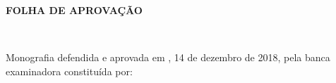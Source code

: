 \documentclass[
	12pt,				%
	openright,			%
	twoside,			%
	a4paper,			%
	english,			%
	french,				%
	spanish,			%
	brazil				%
	]{abntex2}
\begin{document}
\newpage


\afterpage{\null\newpage}



%
% 
%
\begin{folhadeaprovacao}
  \begin{center}
    {\ABNTEXchapterfont\large\imprimirinstituicao}

    \vspace*{\fill}\vspace*{\fill}
    \begin{center}
    {\par \Large \centering \textbf{FOLHA DE APROVAÇÃO}}
      \newline
     \\ \ABNTEXchapterfont\bfseries\Large\imprimirtitulo
    \end{center}
    \vspace*{\fill}
    
    \imprimirautor
    \vspace*{\fill}\vspace*{\fill}
    
    \hspace{.45\textwidth}
    \begin{minipage}{.5\textwidth}
        \imprimirpreambulo
    \end{minipage}
    \vspace*{\fill}
   \end{center}
        
   Monografia defendida e aprovada em \imprimirlocal,  14 de dezembro de 2018, pela banca examinadora constituída por:

      
   \begin{center}
    \vspace*{0.5cm}
    {\large\imprimirlocal}
    \par
    {\large\imprimirdata}
    \vspace*{1cm}
  \end{center}
  
\end{folhadeaprovacao}
\end{document}
